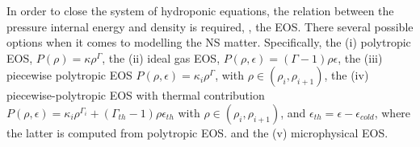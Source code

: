 
In order to close the system of hydroponic equations, the relation between the pressure 
internal energy and density is required, \ie, the \ac{EOS}. 
There several possible options when it comes to modelling the \ac{NS} matter. 
Specifically, 
the (i) polytropic \ac{EOS}, $P(\rho)=\kappa\rho^{\Gamma}$, 
the (ii) ideal gas \ac{EOS}, $P(\rho,\epsilon)=(\Gamma-1)\rho\epsilon$, 
the (iii) piecewise polytropic \ac{EOS} $P(\rho,\epsilon) = \kappa_i\rho^{\Gamma}$, with 
$\rho\in(\rho_i,\rho_{i+1})$, 
the (iv) piecewise-polytropic \ac{EOS} with thermal contribution $P(\rho,\epsilon)=\kappa_i\rho^{\Gamma_i} + (\Gamma_{th}-1)\rho\epsilon_{th}$ with $\rho\in(\rho_i,\rho_{i+1})$, and $\epsilon_{th}=\epsilon-\epsilon_{cold}$, where the latter 
is computed from polytropic \ac{EOS}.
and the (v) microphysical \ac{EOS}.


